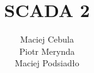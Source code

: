 \documentclass[12pt]{report}
\title{\textbf{SCADA 2}}
\author{Maciej Cebula \\Piotr Merynda \\Maciej Podsiadło}
\date{}
\begin{document}
	

	
	\setcounter{tocdepth}{2}
	
	\maketitle
	\tableofcontents
	\clearpage
		
		\renewcommand{\tablename}{Tabela}
		\renewcommand{\figurename}{Rys.}
		
	
	
	
	
	
	
	
	
	
\end{document}
